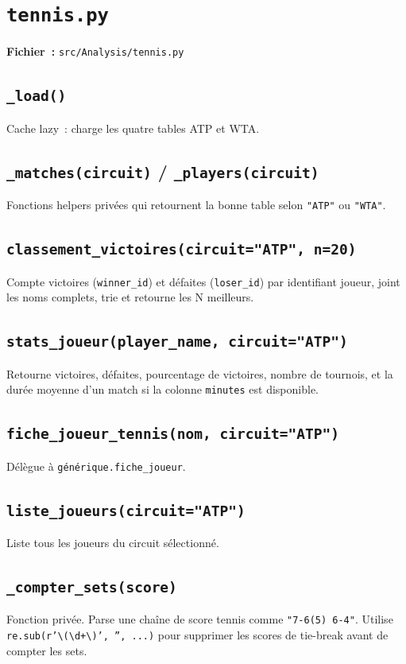 \documentclass[12pt,a4paper]{article}
\begin{document}
\section{\texttt{tennis.py}}

\textbf{Fichier~:} \texttt{src/Analysis/tennis.py}

\subsection{\texttt{\_load()}}
Cache lazy~: charge les quatre tables ATP et WTA.

\subsection{\texttt{\_matches(circuit)} / \texttt{\_players(circuit)}}
Fonctions helpers privées qui retournent la bonne table selon
\texttt{"ATP"} ou \texttt{"WTA"}.

\subsection{\texttt{classement\_victoires(circuit="ATP", n=20)}}
Compte victoires (\texttt{winner\_id}) et défaites (\texttt{loser\_id})
par identifiant joueur, joint les noms complets, trie et retourne les
N meilleurs.

\subsection{\texttt{stats\_joueur(player\_name, circuit="ATP")}}
Retourne victoires, défaites, pourcentage de victoires, nombre de tournois,
et la durée moyenne d'un match si la colonne \texttt{minutes} est disponible.

\subsection{\texttt{fiche\_joueur\_tennis(nom, circuit="ATP")}}
Délègue à \texttt{générique.fiche\_joueur}.

\subsection{\texttt{liste\_joueurs(circuit="ATP")}}
Liste tous les joueurs du circuit sélectionné.

\subsection{\texttt{\_compter\_sets(score)}}
Fonction privée. Parse une chaîne de score tennis comme
\texttt{"7-6(5) 6-4"}. Utilise \texttt{re.sub(r'\textbackslash(\textbackslash d+\textbackslash)', '', ...)}
pour supprimer les scores de tie-break avant de compter les sets.
\end{document}
